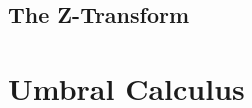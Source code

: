 \subsection{The Z-Transform}



\section{Umbral Calculus}




\begin{comment}


Why don't they teach Newton's calculus of 'What comes next?'
https://www.youtube.com/watch?v=4AuV93LOPcE

\end{comment}